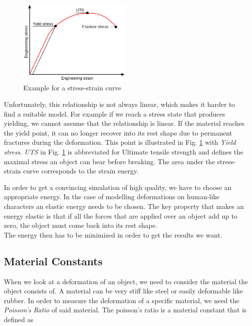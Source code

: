 \begin{figure}[!htbp]
	\centering
	\includegraphics[width=0.5\textwidth]{resources/stress_strain_curve.png}
	\caption{Example for a stress-strain curve}
	\label{fig:stress_strain}
\end{figure}

Unfortunately, this relationship is not always linear, which makes it harder to find a suitable model. For example if we reach a stress state that produces yielding, we cannot assume that the relationship is linear. If the material reaches the yield point, it can no longer recover into its rest shape due to permanent fractures during the deformation. This point is illustrated in Fig. \ref{fig:stress_strain} with \textit{Yield stress}. \textit{UTS} in Fig. \ref{fig:stress_strain} is abbreviated for Ultimate tensile strength and defines the maximal stress an object can bear before breaking. The area under the stress-strain curve corresponds to the strain energy.

In order to get a convincing simulation of high quality, we have to choose an appropriate energy. In the case of modelling deformations on human-like characters an elastic energy needs to be chosen. The key property that makes an energy elastic is that if all the forces that are applied over an object add up to zero, the object must come back into its rest shape.
\\
The energy then has to be minimized in order to get the results we want.

\subsection{Material Constants}
When we look at a deformation of an object, we need to consider the material the object consists of. A material can be very stiff like steel or easily deformable like rubber. In order to measure the deformation of a specific material, we need the \textit{Poisson's Ratio} of said material. The poisson's ratio is a material constant that is defined as 

